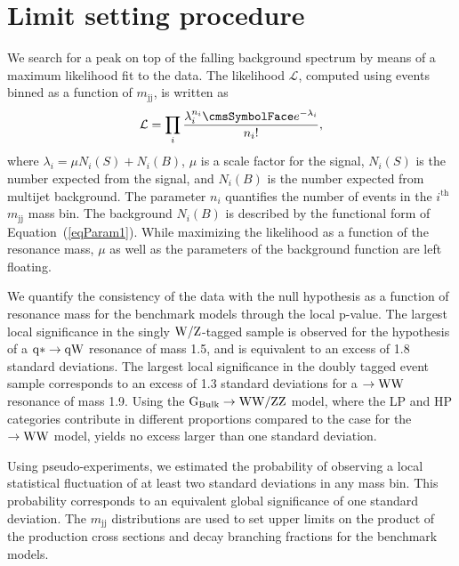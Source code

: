 \newpage
\section{Limit setting procedure}
\label{sec:statistics}



We search for a peak on top of the falling background spectrum by
means of a maximum likelihood fit to the data. The likelihood $\mathcal{L}$, computed using events binned as a function of $m_\mathrm{jj}$,
is written as
\begin{equation} \mathcal{L} = \prod_{i}
  \frac{\lambda_{i}^{n_{i}}\re^{-\lambda_{i}}}{n_{i}!},
\end{equation}
where ${\lambda_{i}} = {\mu}{N_{i}(S)} + {N_{i}(B)}$,
$\mu$ is a scale factor for the signal, $N_i(S)$ is the number
expected from the signal, and $N_i(B)$ is the number expected from
multijet background. The parameter $n_i$ quantifies the number of
events in the $i^\mathrm{th}$ $m_\mathrm{jj}$ mass bin.
The background $N_i(B)$ is described by the functional form of
Equation~(\ref{eqParam1}). While maximizing the likelihood as a function of
the resonance mass, $\mu$ as well as the parameters of the background
function are left floating.


We quantify the consistency of the data with the null hypothesis as a
function of resonance mass for the benchmark models through the local
p-value. The largest local significance in the singly
${\rm W}/{\rm Z}$-tagged sample is observed for the hypothesis of a ${\rm q*
\to q{\rm W}}$ resonance of mass 1.5\TeVcc, and is equivalent to an excess
of 1.8 standard deviations. The largest local significance in the
doubly tagged event sample corresponds to an excess of 1.3 standard
deviations for a  \GRS$\to{\rm W}{\rm W}$ resonance of mass 1.9\TeVcc. Using the
${\rm G_\mathrm{Bulk}\to{\rm W}{\rm W}/{\rm Z}{\rm Z}}$ model, where the LP and HP categories
contribute in different proportions compared to the case for the
\GRS$\to{\rm W}{\rm W}$ model, yields no excess larger than one standard
deviation. 

Using pseudo-experiments, we estimated the probability of observing a
local statistical fluctuation of at least two standard deviations in
any mass bin. This probability corresponds to an equivalent global
significance of one standard deviation.  The $m_\mathrm{jj}$ distributions
are used to set upper limits on the product of the production cross
sections and decay branching fractions for the benchmark models.